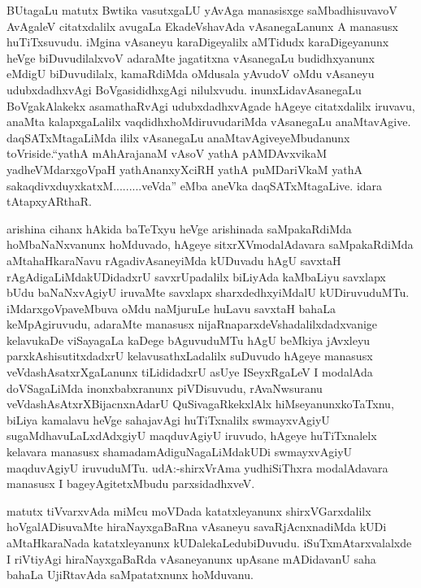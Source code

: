 \begin{artha}
BUtagaLu matutx Bwtika vasutxgaLU yAvAga manasisxge saMbadhisuvavoV
\-AvAgaleV citatxdalilx avugaLa EkadeVshavAda vAsanegaLanunx A manasusx
huTiTx\-suvudu. iMgina vAsaneyu karaDigeyalilx aMTidudx karaDigeyanunx
heVge biDuvudilalxvoV adaraMte jagatitxna vAsanegaLu budidhxyanunx
eMdigU biDuvudilalx, kamaRdiMda oMdusala yAvudoV oMdu vAsaneyu
udubxdadhxvAgi BoVgasididhxgAgi \break nilulxvudu. inunxLidavAsanegaLu
BoVgakAlakekx asamathaRvAgi udubxdadhxvAgade hAgeye citatxdalilx
iruvavu, anaMta kalapxgaLalilx vaqdidhxhoMdiruvudariMda vAsane\-gaLu
anaMtavAgive. daqSATxMtagaLiMda ililx vAsanegaLu
\-anaMtavAgiveyeMbudanunx toVriside.``yathA mAhArajanaM vAsoV yathA pAMDAvxvikaM yadheVMdarxgoVpaH \-yathAnanxyXciRH yathA puMDariVkaM yathA sakaqdivxduyxkatxM.........veVda'' eMba aneVka
daqSATxMtagaLive. idara tAtapxyARthaR.
\end{artha}

\centerline{}

\begin{artha}
arishina cihanx hAkida baTeTxyu heVge arishinada saMpakaRdiMda
hoMbaNaNx\-vanunx hoMduvado, hAgeye sitxrXVmodalAdavara saMpakaRdiMda
aMtahaHkaraNavu rAga\-divAsaneyiMda kUDuvadu hAgU savxtaH
rAgAdigaLiMdakUDidadxrU savxrUpadalilx biLiyAda kaMbaLiyu savxlapx
bUdu baNaNxvAgiyU iruvaMte savxlapx sharxdedhx\-yiMdalU
kUDiruvuduMTu. iMdarxgoVpaveMbuva oMdu naMjuruLe huLavu savxtaH bahaLa
keMpAgiruvudu, adaraMte manasusx nijaRnaparxdeVshadalilxdadxvanige
kelavukaDe viSaya\-gaLa kaDege bAguvuduMTu hAgU beMkiya jAvxleyu
parxkAshisutitxdadxrU kelavusathxLa\-dalilx suDuvudo hAgeye manasusx
veVdashAsatxrXgaLanunx tiLididadxrU asUye ISeyxR\-gaLeV I modalAda
doVSagaLiMda inonxbabxranunx piVDisuvudu, rAvaNwsuranu
veVdashAsAtxrXBijacnxnAdarU QuSivagaRkekxlAlx hiMseyanunxkoTaTxnu,
biLiya kamalavu heVge sahajavAgi huTiTxnalilx swmayxvAgiyU
sugaMdhavuLaLxdAdxgiyU maqduvAgiyU iruvudo, hAgeye huTiTxnalelx
kelavara manasusx shamadamAdiguNagaLiMdakUDi swmayxvAgiyU maqduvAgi\-yU
iruvuduMTu. udA:-shirxVrAma yudhiSiThxra modalAdavara manasusx I
bageyAgitetxMbudu parxsidadhxveV.
\end{artha}

\begin{artha}
matutx tiVvarxvAda miMcu moVDada katatxleyanunx shirxVGarxdalilx
hoVgalADisu\-vaMte hiraNayxgaBaRna vAsaneyu savaRjAcnxnadiMda kUDi
aMtaHkaraNada katatxleyanunx kUDalekaLedubiDuvudu. iSuTxmAtarxvalalxde
I riVtiyAgi hiraNayxgaBaRda vAsaneyanunx upAsane mADidavanU saha
bahaLa UjiRtavAda saMpatatxnunx hoMduvanu.
\end{artha}

